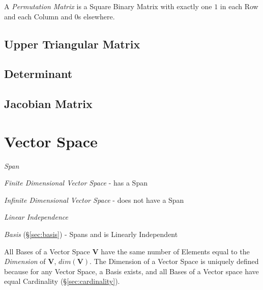 A \emph{Permutation Matrix} is a Square Binary Matrix with exactly one
$1$ in each Row and each Column and $0$s elsewhere.



\subsection{Upper Triangular Matrix}\label{sec:upper_triangular}

\subsection{Determinant}\label{sec:determinant}

\subsection{Jacobian Matrix}\label{sec:jacobian_matrix}



\section{Vector Space}\label{sec:vector_space}

\emph{Span}

\emph{Finite Dimensional Vector Space} - has a Span

\emph{Infinite Dimensional Vector Space} - does not have a Span

\emph{Linear Independence}

\emph{Basis} (\S\ref{sec:basis}) - Spans and is Linearly Independent

All Bases of a Vector Space $\mathbf{V}$ have the same number of
Elements equal to the \emph{Dimension} of $\mathbf{V}$,
$dim(\mathbf{V})$. The Dimension of a Vector Space is uniquely defined
because for any Vector Space, a Basis exists, and all Bases of a
Vector space have equal Cardinality (\S\ref{sec:cardinality}).

